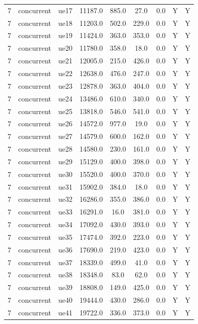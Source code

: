 \begin{table}[ht]
\begin{tabular}{|c|c|c|c|c|c|c|c|c|}
7 & concurrent & ue17 & 11187.0 & 885.0 & 27.0 & 0.0 & Y & Y \\
7 & concurrent & ue18 & 11203.0 & 502.0 & 229.0 & 0.0 & Y & Y \\
7 & concurrent & ue19 & 11424.0 & 363.0 & 353.0 & 0.0 & Y & Y \\
7 & concurrent & ue20 & 11780.0 & 358.0 & 18.0 & 0.0 & Y & Y \\
7 & concurrent & ue21 & 12005.0 & 215.0 & 426.0 & 0.0 & Y & Y \\
7 & concurrent & ue22 & 12638.0 & 476.0 & 247.0 & 0.0 & Y & Y \\
7 & concurrent & ue23 & 12878.0 & 363.0 & 404.0 & 0.0 & Y & Y \\
7 & concurrent & ue24 & 13486.0 & 610.0 & 340.0 & 0.0 & Y & Y \\
7 & concurrent & ue25 & 13818.0 & 546.0 & 541.0 & 0.0 & Y & Y \\
7 & concurrent & ue26 & 14572.0 & 977.0 & 19.0 & 0.0 & Y & Y \\
7 & concurrent & ue27 & 14579.0 & 600.0 & 162.0 & 0.0 & Y & Y \\
7 & concurrent & ue28 & 14580.0 & 230.0 & 161.0 & 0.0 & Y & Y \\
7 & concurrent & ue29 & 15129.0 & 400.0 & 398.0 & 0.0 & Y & Y \\
7 & concurrent & ue30 & 15520.0 & 400.0 & 370.0 & 0.0 & Y & Y \\
7 & concurrent & ue31 & 15902.0 & 384.0 & 18.0 & 0.0 & Y & Y \\
7 & concurrent & ue32 & 16286.0 & 355.0 & 386.0 & 0.0 & Y & Y \\
7 & concurrent & ue33 & 16291.0 & 16.0 & 381.0 & 0.0 & Y & Y \\
7 & concurrent & ue34 & 17092.0 & 430.0 & 393.0 & 0.0 & Y & Y \\
7 & concurrent & ue35 & 17474.0 & 392.0 & 223.0 & 0.0 & Y & Y \\
7 & concurrent & ue36 & 17690.0 & 219.0 & 423.0 & 0.0 & Y & Y \\
7 & concurrent & ue37 & 18339.0 & 499.0 & 41.0 & 0.0 & Y & Y \\
7 & concurrent & ue38 & 18348.0 & 83.0 & 62.0 & 0.0 & Y & Y \\
7 & concurrent & ue39 & 18808.0 & 149.0 & 425.0 & 0.0 & Y & Y \\
7 & concurrent & ue40 & 19444.0 & 430.0 & 286.0 & 0.0 & Y & Y \\
7 & concurrent & ue41 & 19722.0 & 336.0 & 373.0 & 0.0 & Y & Y \\

\end{tabular}
\end{table}
